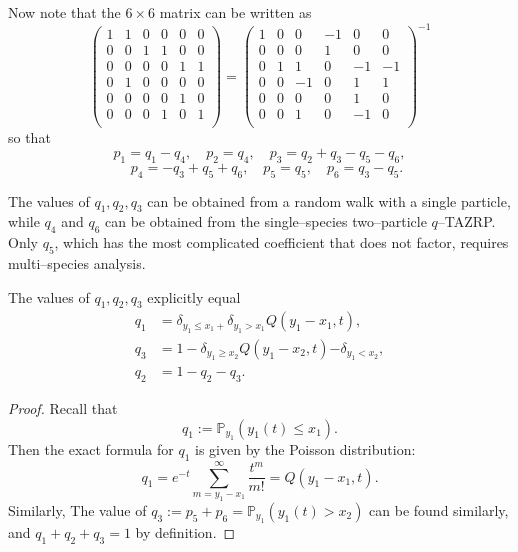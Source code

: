 \documentclass{ximera}
\begin{document}
Now note that the  $6\times 6$ matrix can be written as
$$
\left(\begin{array}{cccccc}1&1&0&0&0&0\\0&0&1&1&0&0\\0&0&0&0&1&1\\0&1&0&0&0&0\\0&0&0&0&1&0\\0&0&0&1&0&1\\\end{array}\right) =  \left(\begin{array}{cccccc}1&0&0&-1&0&0\\0&0&0&1&0&0\\0&1&1&0&-1&-1\\0&0&-1&0&1&1\\0&0&0&0&1&0\\0&0&1&0&-1&0\\\end{array}\right)^{-1}
$$
so that
$$
p_1 = q_1-q_4, \quad p_2=q_4, \quad p_3 = q_2+q_3-q_5-q_6,
$$
$$  \quad p_4 = -q_3 + q_5+q_6, \quad p_5=q_5, \quad p_6=q_3-q_5.$$

The values of $q_1,q_2,q_3$ can be obtained from a random walk with a single particle, while $q_4$ and $q_6$ can be obtained from the single--species two--particle $q$--TAZRP. Only $q_5$, which has the most complicated coefficient that does not factor, requires multi--species analysis. 

\begin{lemma}
The values of $q_1,q_2,q_3$ explicitly equal
\begin{align*}
q_1 &= {\delta_{y_1\le x_1+}\delta_{y_1> x_1} }Q(y_1-x_1,t) , \\
q_3 &=  1 - {\delta_{y_1\ge x_2}Q(y_1-x_2,t)}{-\delta_{y_1<x_2}}, \\
q_2 &= 1- q_2-q_3.
\end{align*}
\end{lemma}



\begin{proof}
Recall that
$$
q_1 := \mathbb{P}_{y_1}( y_1(t) \leq x_1  ). 
$$
Then the  exact formula for $q_1$ is given by the Poisson distribution:
$$
q_1 = e^{-t} \sum_{m=y_1-x_1}^{\infty} \frac{t^m}{m!} = Q(y_1-x_1,t).
$$
Similarly, 
The value of $q_3:=p_5+p_6 = \mathbb{P}_{y_1}( y_1(t) > x_2)$ can be found similarly, and $q_1+q_2+q_3=1$ by definition.

\end{proof}
\end{document}

